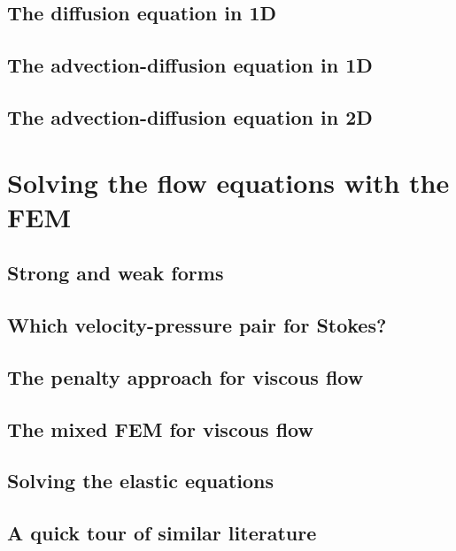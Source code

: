 \documentclass[a4paper]{article}
\begin{document}
\subsection{The diffusion equation in 1D} \label{sec:diff1D}  %
\subsection{The advection-diffusion equation in 1D} \label{sec:advec-diff1D} %
\subsection{The advection-diffusion equation in 2D}


\newpage 
\section{Solving the flow equations with the FEM} \label{solvingFEM} %
\subsection{Strong and weak forms}  %
\subsection{Which velocity-pressure pair for Stokes?}  %
\subsection{The penalty approach for viscous flow}\label{sec:penalty} %
\subsection{The mixed FEM for viscous flow}  %
\subsection{Solving the elastic equations} %
\subsection{A quick tour of similar literature}  %
\end{document}
